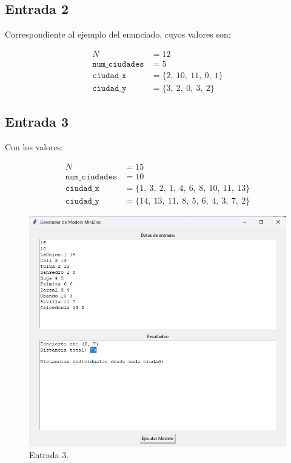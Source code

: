 \documentclass[conference]{IEEEtran}
\begin{document}
\subsection{Entrada 2}

Correspondiente al ejemplo del enunciado, cuyos valores son:

\begin{align*}
	N &= 12 \\
	\texttt{num\_ciudades} &= 5 \\
	\texttt{ciudad\_x} &= \{2,\ 10,\ 11,\ 0,\ 1\} \\
	\texttt{ciudad\_y} &= \{3,\ 2,\ 0,\ 3,\ 2\}
\end{align*}

\subsection{Entrada 3}

Con los valores:

\begin{align*}
	N &= 15 \\
	\texttt{num\_ciudades} &= 10 \\
	\texttt{ciudad\_x} &= \{1,\ 3,\ 2,\ 1,\ 4,\ 6,\ 8,\ 10,\ 11,\ 13\} \\
	\texttt{ciudad\_y} &= \{14,\ 13,\ 11,\ 8,\ 5,\ 6,\ 4,\ 3,\ 7,\ 2\}
\end{align*}

\begin{figure}[h]
	\centering
	\includegraphics[width=1.0\linewidth]{images/entrada3}
	\caption{Entrada 3.}
	\label{fig:entrada3}
\end{figure}
\end{document}
